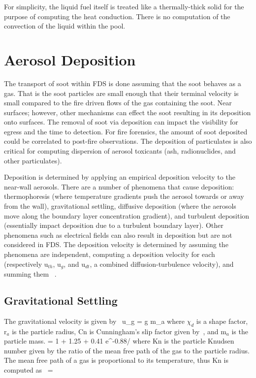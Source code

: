 For simplicity, the liquid fuel itself is treated like a thermally-thick
solid for the purpose of computing the heat conduction. There is no
computation of the convection of the liquid within the pool.

\clearpage

\section{Aerosol Deposition}

The transport of soot within FDS is done assuming that the soot behaves as a gas.  That is the soot particles are small enough that their terminal velocity is small compared to the fire driven flows of the gas containing the soot.  Near surfaces; however, other mechanisms can effect the soot resulting in its deposition onto surfaces.  The removal of soot via deposition can impact the visibility for egress and the time to detection.  For fire forensics, the amount of soot deposited could be correlated to post-fire observations.  The deposition of particulates is also critical for computing dispersion of aerosol toxicants (ash, radionuclides, and other particulates).  

Deposition is determined by applying an empirical deposition velocity to the near-wall aerosols.  There are a number of phenomena that cause deposition: thermophoresis (where temperature gradients push the aerosol towards or away from the wall), gravitational settling, diffusive deposition (where the aerosols move along the boundary layer concentration gradient), and turbulent deposition (essentially impact deposition due to a turbulent boundary layer).  Other phenomena such as electrical fields can also result in deposition but are not considered in FDS.  The deposition velocity is determined by assuming the phenomena are independent, computing a deposition velocity for each (respectively u$_{th}$, u$_g$, and u$_{dt}$, a combined diffusion-turbulence velocity), and summing them~\cite{Bixler:1} .  

\subsection{Gravitational Settling}

The gravitational velocity is given by~\cite{Davies_Charles}
\be
u_g = g m_a 
\ee
where $\chi_d$ is a shape factor, r$_a$ is the particle radius, Cn is Cunningham's slip factor given by~\cite{Cunningham:1}, and m$_a$ is the particle mass.
\be
{} = 1 + 1.25 \;  + 0.41 \;  \; e^{-0.88/}
\ee
where Kn is the particle Knudsen number given by the ratio of the mean free path of the gas to the particle radius. The mean free path of a gas is proportional to its temperature, thus Kn is computed as~\cite{Sippola:1}
\be
{} =  
\ee

